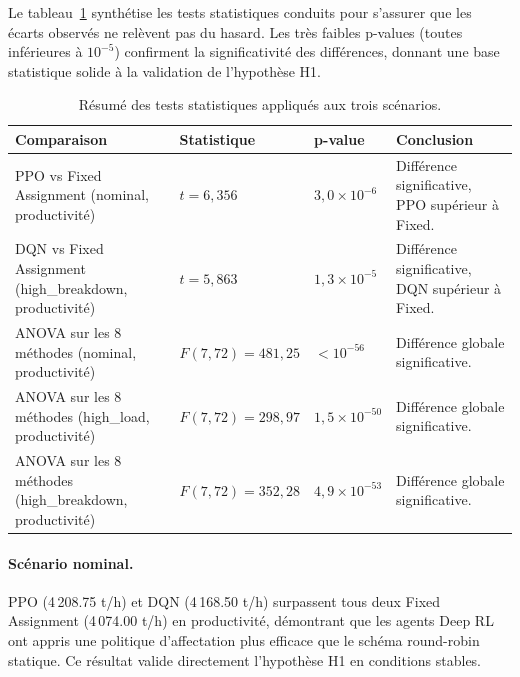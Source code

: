 \documentclass[11pt,a4paper]{report}
\begin{document}
Le tableau~\ref{tab:statistical_tests} synth\'etise les tests statistiques conduits pour s'assurer que les \'ecarts observ\'es ne rel\`event pas du hasard. Les tr\`es faibles p-values (toutes inf\'erieures \`a $10^{-5}$) confirment la significativit\'e des diff\'erences, donnant une base statistique solide \`a la validation de l'hypoth\`ese H1.

\begin{table}[H]
    \centering
    \caption{Résumé des tests statistiques appliqués aux trois scénarios.}
    \label{tab:statistical_tests}
    \small
    \begin{tabular}{>{\raggedright\arraybackslash}p{4.7cm} >{\raggedright\arraybackslash}p{2.6cm} >{\raggedright\arraybackslash}p{3.5cm} >{\raggedright\arraybackslash}p{4.3cm}}
        \toprule
        \textbf{Comparaison} & \textbf{Statistique} & \textbf{p-value} & \textbf{Conclusion} \\
        \midrule
        PPO vs Fixed Assignment (nominal, productivité) & $t = 6{,}356$ & $3{,}0 \times 10^{-6}$ & Différence significative, PPO supérieur à Fixed. \\
        DQN vs Fixed Assignment (high\_breakdown, productivité) & $t = 5{,}863$ & $1{,}3 \times 10^{-5}$ & Différence significative, DQN supérieur à Fixed. \\
        ANOVA sur les 8 méthodes (nominal, productivité) & $F(7, 72) = 481{,}25$ & $< 10^{-56}$ & Différence globale significative. \\
        ANOVA sur les 8 méthodes (high\_load, productivité) & $F(7, 72) = 298{,}97$ & $1{,}5 \times 10^{-50}$ & Différence globale significative. \\
        ANOVA sur les 8 méthodes (high\_breakdown, productivité) & $F(7, 72) = 352{,}28$ & $4{,}9 \times 10^{-53}$ & Différence globale significative. \\
        \bottomrule
    \end{tabular}
\end{table}

\paragraph{Scénario nominal.}
PPO (4\,208.75 t/h) et DQN (4\,168.50 t/h) surpassent tous deux Fixed Assignment (4\,074.00 t/h) en productivité, démontrant que les agents Deep RL ont appris une politique d'affectation plus efficace que le schéma round-robin statique. Ce résultat valide directement l'hypothèse H1 en conditions stables.
\end{document}
